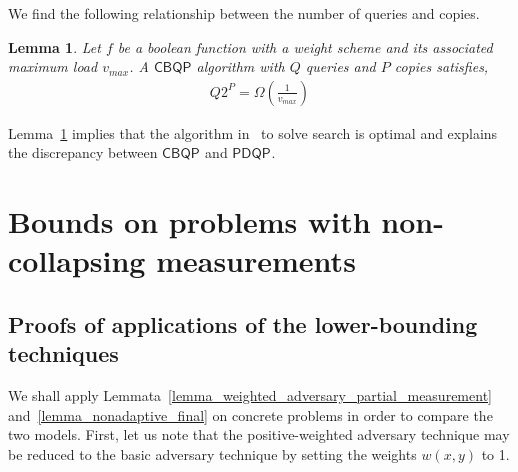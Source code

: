 \documentclass[10pt,a4paper]{article}
\newcommand{\queryamount}[0]{\ensuremath{Q}\xspace}
\newcommand{\abilityamount}[0]{\ensuremath{P}\xspace} %
\newcommand{\compclass}[2][]{\ensuremath{\mathsf{#2}^{#1}}\xspace}
\newcommand{\pdqpname}[0]{\compclass{PDQP}}
\newcommand{\copybqpname}[0]{\compclass{CBQP}}
\newtheorem{lemma}[theorem]{Lemma}
\begin{document}
We find the following relationship between the number of queries and copies.

\begin{lemma}\label{lemma_copy_adversary}
    Let $f$ be a boolean function with a weight scheme and its associated maximum load $v_{max}$. A $\mathsf{CBQP}$ algorithm with \queryamount queries and \abilityamount copies satisfies,
        \begin{align*}
            \queryamount 2^{\abilityamount} = \Omega\left(\frac{1}{v_{max}}\right)
        \end{align*}
\end{lemma}

Lemma~\ref{lemma_copy_adversary} implies that the algorithm in~\cite{grover_search_no_signaling_principle} to solve search is optimal and explains the discrepancy between \copybqpname and \pdqpname.

\section{Bounds on problems with non-collapsing measurements}

\subsection{Proofs of applications of the lower-bounding techniques}\label{subsection_proof_application}

We shall apply Lemmata~\ref{lemma_weighted_adversary_partial_measurement} and~\ref{lemma_nonadaptive_final} on concrete problems in order to compare the two models. First, let us note that the positive-weighted adversary technique may be reduced to the basic adversary technique by setting the weights $w(x,y)$ to 1.
\end{document}

